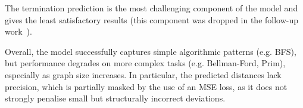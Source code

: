 \documentclass[11pt, a4paper]{article}
\begin{document}
The termination prediction is the most challenging component of the model and gives the least satisfactory results (this component was dropped in the follow-up work~\cite{velickovic2022clrs}).

Overall, the model successfully captures simple algorithmic patterns (e.g. BFS), but performance degrades on more complex tasks (e.g. Bellman-Ford, Prim), especially as graph size increases. In particular, the predicted distances lack precision, which is partially masked by the use of an MSE loss, as it does not strongly penalise small but structurally incorrect deviations.



\end{document}
